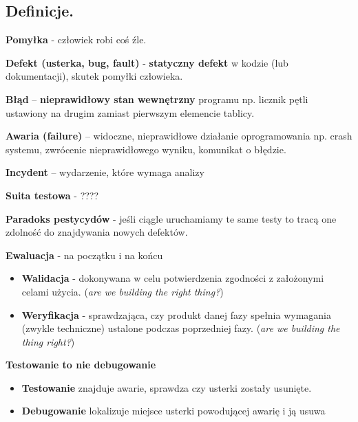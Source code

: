 \documentclass[../main.tex]{subfiles}
\begin{document}
    \subsection{Definicje.}

    \textbf{Pomyłka} - człowiek robi coś źle.

    \textbf{Defekt (usterka, bug, fault)} - \textbf{statyczny defekt} w kodzie (lub dokumentacji), skutek pomyłki człowieka.

    \textbf{Błąd} – \textbf{nieprawidłowy stan wewnętrzny} programu
    np. licznik pętli ustawiony na drugim zamiast pierwszym elemencie tablicy.

    \textbf{Awaria (failure)} – widoczne, nieprawidłowe działanie oprogramowania
    np. crash systemu, zwrócenie nieprawidłowego wyniku, komunikat o błędzie.

    \textbf{Incydent} – wydarzenie, które wymaga analizy

    \textbf{Suita testowa} - ????

    \textbf{Paradoks pestycydów} - jeśli ciągle uruchamiamy te same testy to tracą one zdolność do znajdywania nowych defektów.

    \textbf{Ewaluacja} - na początku i na końcu
    \begin{itemize}
        \item  \textbf{Walidacja} - dokonywana w celu
        potwierdzenia zgodności z założonymi celami użycia. (\textit{are we building the right thing?})

        \item \textbf{Weryfikacja} - sprawdzająca, czy produkt danej fazy spełnia wymagania
        (zwykle techniczne) ustalone podczas poprzedniej fazy. (\textit{are we building the thing right?})
    \end{itemize}

    \textbf{Testowanie to nie debugowanie}
    \begin{itemize}
        \item \textbf{Testowanie} znajduje awarie, sprawdza czy usterki zostały usunięte.
        \item \textbf{Debugowanie} lokalizuje miejsce usterki powodującej awarię i ją usuwa
    \end{itemize}
\end{document}
